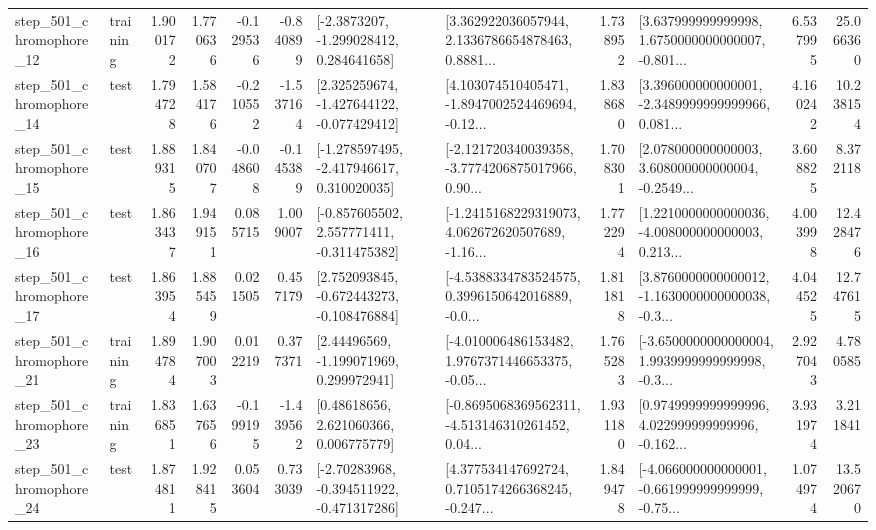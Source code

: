 \begin{tabular}{llrrrrllrlrr}
  step\_501\_chromophore\_12 &  training &      1.900172 &    1.770636 &     -0.129536 & -0.840899 &     [-2.3873207, -1.299028412, 0.284641658] &  [3.362922036057944, 2.1336786654878463, 0.8881... &       1.738952 &  [3.637999999999998, 1.6750000000000007, -0.801... &            6.537995 &         25.066360 \\
  step\_501\_chromophore\_14 &      test &      1.794728 &    1.584176 &     -0.210552 & -1.537164 &   [2.325259674, -1.427644122, -0.077429412] &  [4.103074510405471, -1.8947002524469694, -0.12... &       1.838680 &  [3.396000000000001, -2.3489999999999966, 0.081... &            4.160242 &         10.238154 \\
  step\_501\_chromophore\_15 &      test &      1.889315 &    1.840707 &     -0.048608 & -0.145389 &   [-1.278597495, -2.417946617, 0.310020035] &  [-2.121720340039358, -3.7774206875017966, 0.90... &       1.708301 &  [2.078000000000003, 3.608000000000004, -0.2549... &            3.608825 &          8.372118 \\
  step\_501\_chromophore\_16 &      test &      1.863437 &    1.949151 &      0.085715 &  1.009007 &   [-0.857605502, 2.557771411, -0.311475382] &  [-1.2415168229319073, 4.062672620507689, -1.16... &       1.772294 &  [1.2210000000000036, -4.008000000000003, 0.213... &            4.003998 &         12.428476 \\
  step\_501\_chromophore\_17 &      test &      1.863954 &    1.885459 &      0.021505 &  0.457179 &   [2.752093845, -0.672443273, -0.108476884] &  [-4.5388334783524575, 0.3996150642016889, -0.0... &       1.811818 &  [3.8760000000000012, -1.1630000000000038, -0.3... &            4.044525 &         12.747615 \\
  step\_501\_chromophore\_21 &  training &      1.894784 &    1.907003 &      0.012219 &  0.377371 &     [2.44496569, -1.199071969, 0.299972941] &  [-4.010006486153482, 1.9767371446653375, -0.05... &       1.765283 &  [-3.6500000000000004, 1.9939999999999998, -0.3... &            2.927043 &          4.780585 \\
  step\_501\_chromophore\_23 &  training &      1.836851 &    1.637656 &     -0.199195 & -1.439562 &      [0.48618656, 2.621060366, 0.006775779] &  [-0.8695068369562311, -4.513146310261452, 0.04... &       1.931180 &  [0.9749999999999996, 4.022999999999996, -0.162... &            3.931974 &          3.211841 \\
  step\_501\_chromophore\_24 &      test &      1.874811 &    1.928415 &      0.053604 &  0.733039 &   [-2.70283968, -0.394511922, -0.471317286] &  [4.377534147692724, 0.7105174266368245, -0.247... &       1.849478 &  [-4.066000000000001, -0.661999999999999, -0.75... &            1.074974 &         13.520670 \\

\end{tabular}
